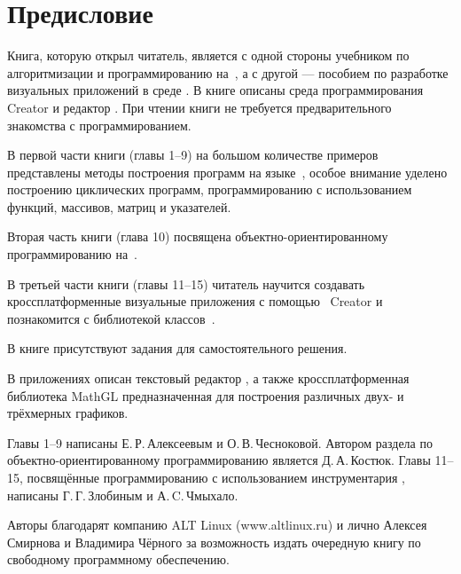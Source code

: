 

\chapter*{Предисловие}
Книга, которую открыл читатель, является с одной стороны учебником по алгоритмизации и программированию на~, а с
другой --- пособием по разработке визуальных приложений в среде . В книге описаны среда программирования~
Creator и редактор . При чтении книги не требуется предварительного знакомства с программированием. 

В первой части книги (главы 1--9) на большом количестве примеров представлены методы построения программ на языке~,
особое внимание уделено построению циклических программ, программированию с использованием функций, массивов, матриц и
указателей. 

Вторая часть книги (глава 10) посвящена объектно-ориентированному программированию на~. 

В третьей части книги (главы 11--15) читатель научится создавать кроссплатформенные визуальные приложения с помощью~
Creator и познакомится с библиотекой классов~.

В книге присутствуют задания для самостоятельного решения.

В приложениях описан текстовый редактор , а также кросс\-платформенная библиотека MathGL предназначенная для построения
различных двух- и трёхмерных графиков.

Главы 1--9 написаны Е.\,Р.\,Алексеевым и О.\,В.\,Чесноковой. Автором раздела по объектно-ориентированному программированию
является Д.\,А.\,Костюк. Главы 11--15, посвящённые программированию с использованием инструментария , написаны 
Г.\,Г.\,Злобиным и А.\,C.\,Чмыхало.

Авторы благодарят компанию ALT Linux (www.altlinux.ru) и лично Алексея Смирнова и Владимира Чёрного за  возможность
издать очередную книгу по свободному программному обеспечению.

%
